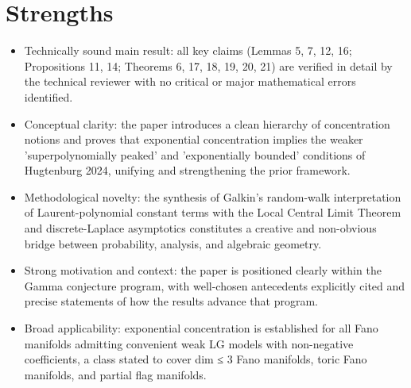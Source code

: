 \documentclass[11pt]{article}
\begin{document}
\section*{Strengths}
\begin{itemize}[leftmargin=*]
  \item Technically sound main result: all key claims (Lemmas 5, 7, 12, 16; Propositions 11, 14; Theorems 6, 17, 18, 19, 20, 21) are verified in detail by the technical reviewer with no critical or major mathematical errors identified.
  \item Conceptual clarity: the paper introduces a clean hierarchy of concentration notions and proves that exponential concentration implies the weaker 'superpolynomially peaked' and 'exponentially bounded' conditions of Hugtenburg 2024, unifying and strengthening the prior framework.
  \item Methodological novelty: the synthesis of Galkin's random-walk interpretation of Laurent-polynomial constant terms with the Local Central Limit Theorem and discrete-Laplace asymptotics constitutes a creative and non-obvious bridge between probability, analysis, and algebraic geometry.
  \item Strong motivation and context: the paper is positioned clearly within the Gamma conjecture program, with well-chosen antecedents explicitly cited and precise statements of how the results advance that program.
  \item Broad applicability: exponential concentration is established for all Fano manifolds admitting convenient weak LG models with non-negative coefficients, a class stated to cover dim ≤ 3 Fano manifolds, toric Fano manifolds, and partial flag manifolds.
\end{itemize}
\end{document}
